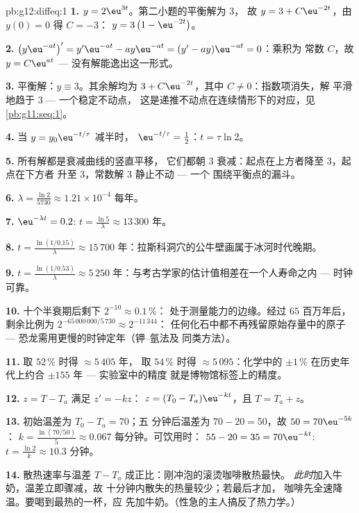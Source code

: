 \begin{solution}{pb:g12:diffeq:1}
\textbf{1.} $y = 2\eu^{3t}$。第二小题的平衡解为 $3$，
故 $y = 3 + C\eu^{-2t}$，由 $y(0) = 0$ 得 $C = -3$：
$y = 3\left(1 - \eu^{-2t}\right)$。

\textbf{2.} $\left(y\eu^{-at}\right)' = y'\eu^{-at} -
ay\eu^{-at} = (y' - ay)\eu^{-at} = 0$：乘积为
常数 $C$，故 $y = C\eu^{at}$ --- 没有解能逸出这一形式。

\textbf{3.} 平衡解：$y \equiv 3$。其余解均为
$3 + C\eu^{-2t}$，其中 $C \neq 0$：指数项消失，解
平滑地趋于 $3$ --- 一个稳定不动点，
这是递推不动点在连续情形下的对应，见
\cref{pb:g11:seq:1}。

\textbf{4.} 当 $y = y_0\eu^{-t/\tau}$ 减半时，
$\eu^{-t/\tau} = \frac12$：$t = \tau\ln 2$。

\textbf{5.} 所有解都是衰减曲线的竖直平移，
它们都朝 $3$ 衰减：起点在上方者降至 $3$，起点在下方者
升至 $3$，常数解 $3$ 静止不动 --- 一个
围绕平衡点的漏斗。

\textbf{6.} $\lambda = \frac{\ln 2}{5730} \approx 1.21 \times
10^{-4}$ 每年。

\textbf{7.} $\eu^{-\lambda t} = 0.2$:
$t = \frac{\ln 5}{\lambda} \approx 13\,300$ 年。

\textbf{8.} $t = \frac{\ln(1/0.15)}{\lambda} \approx 15\,700$
年：拉斯科洞穴的公牛壁画属于冰河时代晚期。

\textbf{9.} $t = \frac{\ln(1/0.53)}{\lambda} \approx 5\,250$
年：与考古学家的估计值相差在一个人寿命之内 ---
时钟可靠。

\textbf{10.} 十个半衰期后剩下 $2^{-10} \approx 0.1\,\%$：
处于测量能力的边缘。经过 $65$ 百万年后，
剩余比例为 $2^{-65\,000\,000/5\,730} \approx 2^{-11\,344}$：
任何化石中都不再残留原始存量中的原子 ---
恐龙需用更慢的时钟定年（钾--氩法及
同类方法）。

\textbf{11.} 取 $52\,\%$ 时得 $\approx 5\,405$ 年，
取 $54\,\%$ 时得 $\approx 5\,095$：化学中的 $\pm 1\,\%$
在历史年代上约合 $\pm 155$ 年 --- 实验室中的精度
就是博物馆标签上的精度。

\textbf{12.} $z = T - T_a$ 满足 $z' = -kz$：
$z = (T_0 - T_a)\eu^{-kt}$，且 $T = T_a + z$。

\textbf{13.} 初始温差为 $T_0 - T_a = 70$；五
分钟后温差为 $70 - 20 = 50$，故 $50 = 70\eu^{-5k}$：
$k = \frac{\ln(70/50)}{5} \approx 0.067$ 每分钟。可饮用时：
$55 - 20 = 35 = 70\eu^{-kt}$:
$t = \frac{\ln 2}{k} \approx 10.3$ 分钟。

\textbf{14.} 散热速率与温差
$T - T_a$ 成正比：刚冲泡的滚烫咖啡散热最快。
\emph{此时}加入牛奶，温差立即骤减，故
十分钟内散失的热量较少；若最后才加，
咖啡先全速降温。要喝到最热的一杯，应
先加牛奶。（性急的主人搞反了热力学。）


\end{solution}
